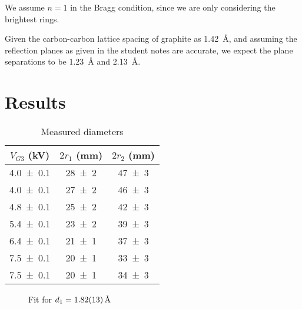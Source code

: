 \documentclass[a4paper]{scrartcl}
\begin{document}
We assume \(n = 1\) in the Bragg condition, since we are only considering the brightest rings.

Given the carbon-carbon lattice spacing of graphite as \SI{1.42}{\angstrom}, and assuming the reflection planes as given in the student notes are accurate, we expect the plane separations to be \SI{1.23}{\angstrom} and \SI{2.13}{\angstrom}.

\section{Results}
\begin{table}
    \centering
    \begin{tabular}{c | c | c}
        \(V_{G3}\) (\si{\kilo\volt}) & \(2 r_1\) (\si{\milli\metre}) & \(2 r_2\) (\si{\milli\metre}) \\
        \hline
        \SI{4.0 \pm 0.1}{} & \SI{28 \pm 2}{} & \SI{47 \pm 3}{} \\
        \SI{4.0 \pm 0.1}{} & \SI{27 \pm 2}{} & \SI{46 \pm 3}{} \\
        \SI{4.8 \pm 0.1}{} & \SI{25 \pm 2}{} & \SI{42 \pm 3}{} \\
        \SI{5.4 \pm 0.1}{} & \SI{23 \pm 2}{} & \SI{39 \pm 3}{} \\
        \SI{6.4 \pm 0.1}{} & \SI{21 \pm 1}{} & \SI{37 \pm 3}{} \\
        \SI{7.5 \pm 0.1}{} & \SI{20 \pm 1}{} & \SI{33 \pm 3}{} \\
        \SI{7.5 \pm 0.1}{} & \SI{20 \pm 1}{} & \SI{34 \pm 3}{}
    \end{tabular}
    \caption{Measured diameters}
    \label{tab:diameters}
\end{table}
\begin{figure}
    \centering
    \caption{Fit for \(d_1 = \SI{1.82 \pm 0.13}{\angstrom}\)}
    \label{fig:d1-fit}
\end{figure}
\end{document}
